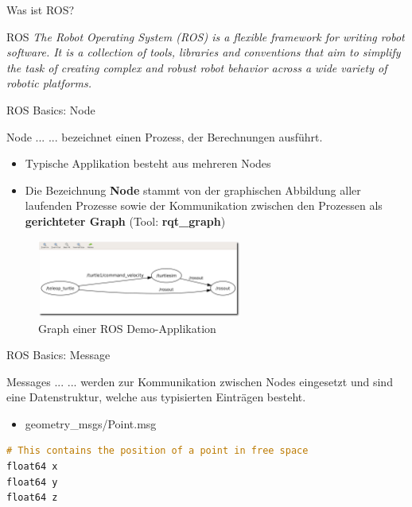 \documentclass{beamer}
\begin{document}
\begin{frame}{Was ist ROS?}
\begin{alertblock}{ROS}
\textit{The Robot Operating System (ROS) is a flexible framework for writing robot software. It is a collection of tools, libraries and conventions that aim to simplify the task of creating complex and robust robot behavior across a wide variety of robotic platforms.}
\end{alertblock}
\end{frame}
\begin{frame}{ROS Basics: Node}
\begin{alertblock}{Node ...}
... bezeichnet einen Prozess, der Berechnungen ausf\"uhrt.
\end{alertblock}
\begin{itemize}
	\item Typische Applikation besteht aus mehreren Nodes
	\item Die Bezeichnung \textbf{Node} stammt von der graphischen Abbildung aller laufenden Prozesse sowie der Kommunikation zwischen den Prozessen als \textbf{gerichteter Graph} (Tool: \textbf{rqt\_graph})
\end{itemize}
\begin{figure}[H]
	\centering
	\includegraphics[width=0.6\textwidth]{./images/rxgraph-turtle-key.png}
	\caption{Graph einer ROS Demo-Applikation\cite{ROS:2015:Online}}
	\label{fig:ros_graph}
\end{figure}
\end{frame}
\begin{frame}[fragile]{ROS Basics: Message}
\begin{alertblock}{Messages ...}
... werden zur Kommunikation zwischen Nodes eingesetzt und sind eine Datenstruktur, welche aus typisierten Eintr\"agen besteht.
\end{alertblock}
\vspace{20px}
\begin{itemize}
	\item geometry\_msgs/Point.msg
\end{itemize}
\begin{lstlisting}[frame=single, language=C]
# This contains the position of a point in free space
float64 x
float64 y
float64 z
\end{lstlisting}
\end{frame}
\end{document}
